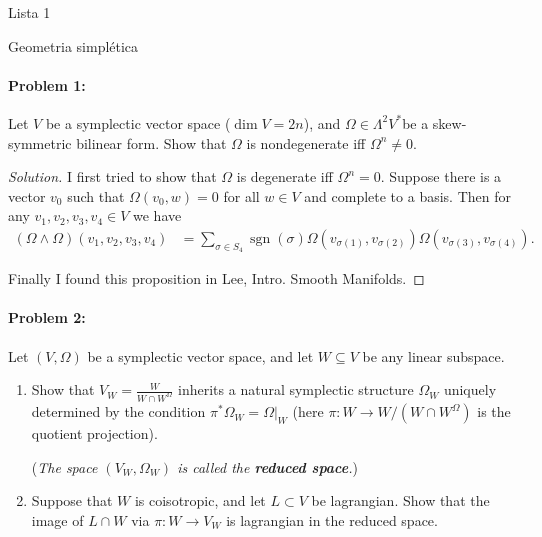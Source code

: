 




{\Huge Lista 1}

{\Large Geometria simpl\'etica}

\paragraph{Problem 1:} Let $V$ be a symplectic vector space ($\dim V=2n$), and $\Omega\in \Lambda^{2} V^{*}$be a skew-symmetric bilinear form. Show that $\Omega$ is nondegenerate iff $\Omega^{n} \neq 0$.

\begin{proof}[Solution]
	I first tried to show that $\Omega$ is degenerate iff $\Omega^{n}=0$. Suppose there is a vector $v_0$ such that $\Omega( v_0,w)=0$ for all $w\in V$ and complete to a basis. Then for any $v_1,v_2,v_3,v_4\in V$ we have
	 \begin{align*}
		 (\Omega\wedge \Omega)(v_1,v_2,v_3,v_4)&=\sum_{\sigma\in S_{4}}\operatorname{s gn}(\sigma)\Omega(v_{\sigma(1)},v_{\sigma(2)})\Omega(v_{\sigma(3)},v_{\sigma(4)}).
		 \end{align*}

		 Finally I found this proposition in Lee, Intro. Smooth Manifolds.
\end{proof}

\paragraph{Problem 2:} Let $(V,\Omega)$ be a symplectic vector space, and let $W\subseteq V$ be any linear subspace.
\begin{enumerate}[label=\alph*.]
	\item Show that $V_{W}=\frac{W}{W\cap W^{\Omega}}$ inherits a natural symplectic structure $\Omega_{W}$ uniquely determined by the condition $\pi^{*} \Omega_{W}=\Omega|_{W}$ (here $\pi:W\to W/(W\cap W^{\Omega}) $ is the quotient projection).
	
		(\textit{The space $(V_{W},\Omega_{W})$ is called the \textbf{reduced space}.})

	\item Suppose that $W$ is coisotropic, and let $L\subset V$ be lagrangian. Show that the image of $L\cap W$ via $\pi:W\to V_{W}$ is lagrangian in the reduced space.
\end{enumerate}

